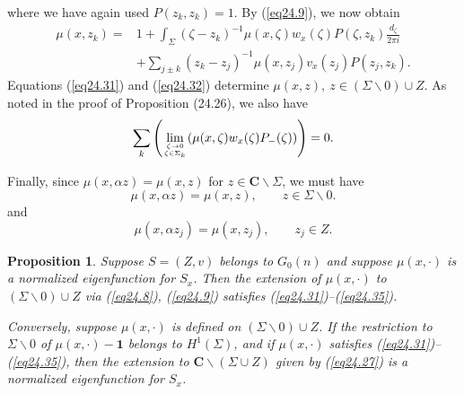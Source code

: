 \documentclass{surv-l}
\theoremstyle{plain}
\newtheorem{prop}[theorem]{Proposition}
\theoremstyle{definition}
\numberwithin{equation}{chapter}
\begin{document}
where we have again used $P(z_{k}, z_{k})=1$. By (\ref{eq24.9}), we now obtain
\begin{align}\label{eq24.32}
\mu(x, z_{k})= & 1+\int_{\Sigma}(\zeta-z_{k})^{-1}\mu(x,\zeta)w_{x}(\zeta)P(\zeta,z_{k})\frac{d_{\zeta}}{2\pi i}\\
& +\sum_{j\pm k}(z_{k}-z_{j})^{-1}\mu(x, z_{j})v_{x}(z_{j})P(z_{j}, z_{k}).\nonumber
\end{align}
Equations (\ref{eq24.31}) and (\ref{eq24.32}) determine $\mu(x, z),\ z\in(\Sigma\backslash 0)\cup Z$. As noted in the proof of Proposition (24.26), we also have
\begin{equation}\label{eq24.33}
\sum_{k}\left(\lim_{{\zeta\rightarrow 0}\atop{\zeta \in \Sigma_{k}}}(\mu(x, \zeta)w_{x}(\zeta)P_{-}(\zeta))\right)=0.
\end{equation}

Finally, since $\mu(x, \alpha z)=\mu(x,z)$ for $ z\in \textbf{C}\backslash \Sigma$, we must have
\setcounter{equation}{33}
\begin{equation}\label{eq24.34}
\mu(x, \alpha z)=\mu(x,z),\qquad z\in\Sigma\backslash 0.
\end{equation}
and
\begin{equation}\label{eq24.35}
\mu(x,\alpha z_{j})=\mu(x,z_{j}),\qquad z_{j}\in Z.
\end{equation}
\setcounter{theorem}{35}
\begin{prop}\label{prop24.36}
Suppose $S= (Z, v)$ belongs to $G_{0}(n)$ and suppose $\mu(x, \cdot)$
is a normalized eigenfunction for $S_{x}$. Then the extension of
$\mu(x, \cdot)$ to $(\Sigma\backslash 0)\cup Z$ via \emph{(\ref{eq24.8})},
\emph{(\ref{eq24.9})} satisfies \emph{(\ref{eq24.31})--(\ref{eq24.35})}.

Conversely, suppose $\mu(x, \cdot)$ is defined on $(\Sigma\backslash
0)\cup Z$. If the restriction to $\Sigma\backslash 0$ of $\mu(x,
\cdot)-\mathbf{1}$ belongs to $H^{1}(\Sigma)$, and if $\mu(x, \cdot)$
satisfies \emph{(\ref{eq24.31})--(\ref{eq24.35})}, then the extension to
$\mathbf{C}\backslash (\Sigma\cup Z)$ given by \emph{(\ref{eq24.27})} is a normalized eigenfunction for $S_{x}$.
\end{prop}
\end{document}
